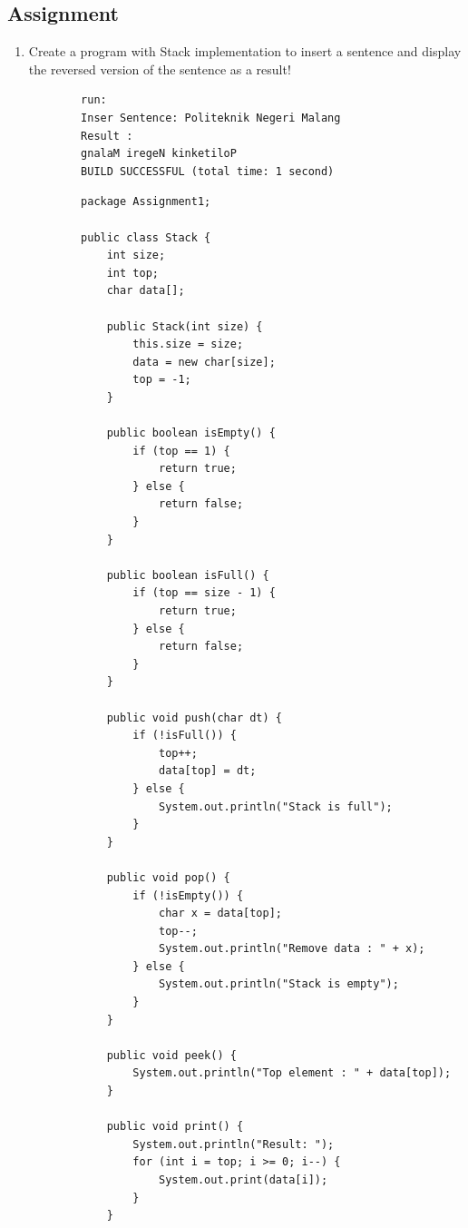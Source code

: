 \documentclass[12pt,titlepage]{article}
\begin{document}
\subsection{Assignment}

\begin{enumerate}
    \item Create a program with Stack implementation to insert a sentence and display the reversed version of the sentence as a result!
    \begin{verbatim}
        run:
        Inser Sentence: Politeknik Negeri Malang
        Result : 
        gnalaM iregeN kinketiloP
        BUILD SUCCESSFUL (total time: 1 second)
    \end{verbatim}
    \begin{verbatim}
        package Assignment1;

        public class Stack {
            int size;
            int top;
            char data[];

            public Stack(int size) {
                this.size = size;
                data = new char[size];
                top = -1;
            }

            public boolean isEmpty() {
                if (top == 1) {
                    return true;
                } else {
                    return false;
                }
            }

            public boolean isFull() {
                if (top == size - 1) {
                    return true;
                } else {
                    return false;
                }
            }

            public void push(char dt) {
                if (!isFull()) {
                    top++;
                    data[top] = dt;
                } else {
                    System.out.println("Stack is full");
                }
            }

            public void pop() {
                if (!isEmpty()) {
                    char x = data[top];
                    top--;
                    System.out.println("Remove data : " + x);
                } else {
                    System.out.println("Stack is empty");
                }
            }

            public void peek() {
                System.out.println("Top element : " + data[top]);
            }

            public void print() {
                System.out.println("Result: ");
                for (int i = top; i >= 0; i--) {
                    System.out.print(data[i]);
                }
            }


\end{verbatim}
\end{enumerate}
\end{document}
